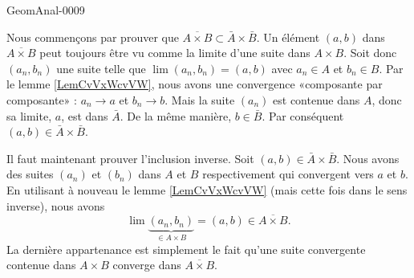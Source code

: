 \begin{corrige}{GeomAnal-0009}

	Nous commençons par prouver que $\overline{ A\times B }\subset\bar A\times \bar B$. Un élément $(a,b)$ dans $\overline{ A\times B }$ peut toujours être vu comme la limite d'une suite dans $A\times B$. Soit donc $(a_n,b_n)$ une suite telle que $\lim(a_n,b_n)=(a,b)$ avec $a_n\in A$ et $b_n\in B$. Par le lemme \ref{LemCvVxWcvVW}, nous avons une convergence «composante par composante» : $a_n\to a$ et $b_n\to b$. Mais la suite $(a_n)$ est contenue dans $A$, donc sa limite, $a$, est dans $\bar A$. De la même manière, $b\in\bar B$. Par conséquent $(a,b)\in \bar A\times\bar B$.

	Il faut maintenant prouver l'inclusion inverse. Soit $(a,b)\in\bar A\times \bar B$. Nous avons des suites $(a_n)$ et $(b_n)$ dans $A$ et $B$ respectivement qui convergent vers $a$ et $b$. En utilisant à nouveau le lemme \ref{LemCvVxWcvVW} (mais cette fois dans le sens inverse), nous avons
	\begin{equation}
		\lim\underbrace{(a_n,b_n)}_{\in A\times B}=(a,b)\in\overline{ A\times B }.
	\end{equation}
	La dernière appartenance est simplement le fait qu'une suite convergente contenue dans $A\times B$ converge dans $\overline{ A\times B }$.

\end{corrige}

